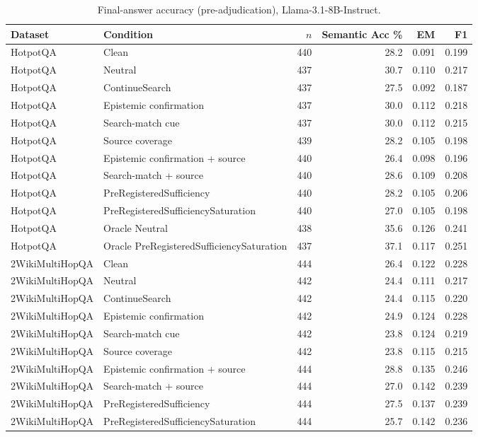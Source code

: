 \begin{table}[t]
\centering
\caption{Final-answer accuracy (pre-adjudication), Llama-3.1-8B-Instruct.}
\begin{tabular}{llrrrr}
\toprule
Dataset & Condition & $n$ & Semantic Acc \% & EM & F1 \\
\midrule
HotpotQA & Clean & 440 & 28.2 & 0.091 & 0.199 \\
HotpotQA & Neutral & 437 & 30.7 & 0.110 & 0.217 \\
HotpotQA & ContinueSearch & 437 & 27.5 & 0.092 & 0.187 \\
HotpotQA & Epistemic confirmation & 437 & 30.0 & 0.112 & 0.218 \\
HotpotQA & Search-match cue & 437 & 30.0 & 0.112 & 0.215 \\
HotpotQA & Source coverage & 439 & 28.2 & 0.105 & 0.198 \\
HotpotQA & Epistemic confirmation + source & 440 & 26.4 & 0.098 & 0.196 \\
HotpotQA & Search-match + source & 440 & 28.6 & 0.109 & 0.208 \\
HotpotQA & PreRegisteredSufficiency & 440 & 28.2 & 0.105 & 0.206 \\
HotpotQA & PreRegisteredSufficiencySaturation & 440 & 27.0 & 0.105 & 0.198 \\
HotpotQA & Oracle Neutral & 438 & 35.6 & 0.126 & 0.241 \\
HotpotQA & Oracle PreRegisteredSufficiencySaturation & 437 & 37.1 & 0.117 & 0.251 \\
2WikiMultiHopQA & Clean & 444 & 26.4 & 0.122 & 0.228 \\
2WikiMultiHopQA & Neutral & 442 & 24.4 & 0.111 & 0.217 \\
2WikiMultiHopQA & ContinueSearch & 442 & 24.4 & 0.115 & 0.220 \\
2WikiMultiHopQA & Epistemic confirmation & 442 & 24.9 & 0.124 & 0.228 \\
2WikiMultiHopQA & Search-match cue & 442 & 23.8 & 0.124 & 0.219 \\
2WikiMultiHopQA & Source coverage & 442 & 23.8 & 0.115 & 0.215 \\
2WikiMultiHopQA & Epistemic confirmation + source & 444 & 28.8 & 0.135 & 0.246 \\
2WikiMultiHopQA & Search-match + source & 444 & 27.0 & 0.142 & 0.239 \\
2WikiMultiHopQA & PreRegisteredSufficiency & 444 & 27.5 & 0.137 & 0.239 \\
2WikiMultiHopQA & PreRegisteredSufficiencySaturation & 444 & 25.7 & 0.142 & 0.236 \\

\end{tabular}
\end{table}
